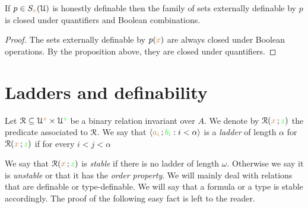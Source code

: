 \begin{corollary}
If $p\in S_{{\color{brown} x}}(\EuScript U)$ is honestly definable then the family of sets externally definable by $p$ is closed under quantifiers and Boolean combinations.
\end{corollary}

\begin{proof}
The sets externally definable by $p({\color{brown} x})$ are always closed under Boolean operations.
By the proposition above, they are closed under quantifiers.
\end{proof}


\section{Ladders and definability}


Let $\EuScript R\subseteq\EuScript U^{\color{brown} x}\times\EuScript U^{\color{green} z}$ be a binary relation invariant over $A$.
We denote by $\EuScript R({\color{brown} x}\,;{\color{green} z})$ the predicate associated to $\EuScript R$.
We say that $\langle{\color{brown}a_i}\,;{\color{green} b_i} : i<\alpha\rangle$ is a \emph{ladder\/} of length $\alpha$ for $\EuScript R({\color{brown} x}\,;{\color{green} z})$ if for every $i<j<\alpha$


We say that $\EuScript R({\color{brown} x}\,;{\color{green} z})$ is \emph{stable\/} if there is no ladder of length $\omega$.
Otherwise we say it is \emph{unstable} or that it has the \emph{order property}.
We will mainly deal with relations that are definable or type-definable.
We will say that a formula or a type is stable accordingly.
The proof of the following easy fact is left to the reader.

